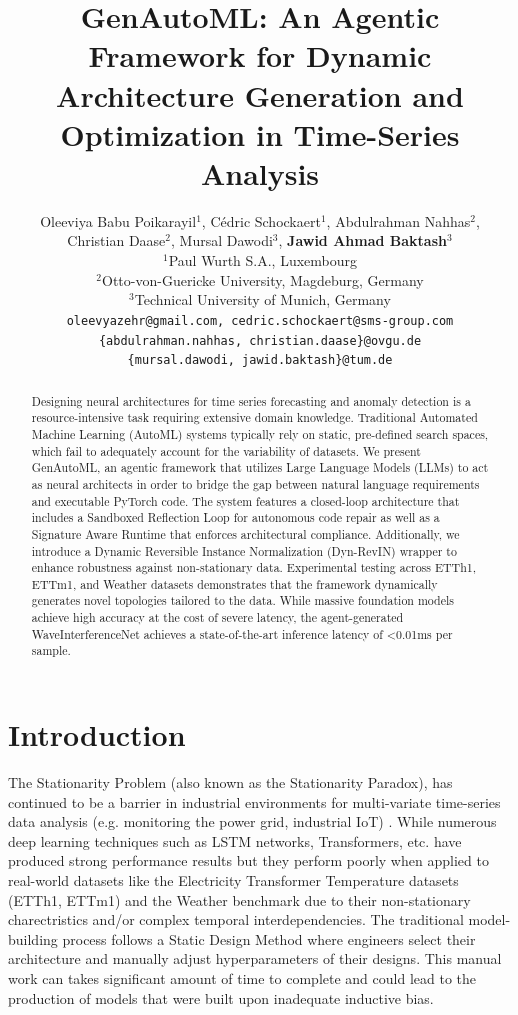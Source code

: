 \documentclass{article}
\title{GenAutoML: An Agentic Framework for Dynamic Architecture Generation and Optimization in Time-Series Analysis}
\author{
Oleeviya Babu Poikarayil$^{1}$, Cédric Schockaert$^{1}$, Abdulrahman Nahhas$^{2}$,\\
Christian Daase$^{2}$, Mursal Dawodi$^{3}$, \textbf{Jawid Ahmad Baktash}$^{3}$\\[0.5ex]
$^{1}$Paul Wurth S.A., Luxembourg\\
$^{2}$Otto-von-Guericke University, Magdeburg, Germany\\
$^{3}$Technical University of Munich, Germany\\[0.5ex]
\texttt{oleevyazehr@gmail.com, cedric.schockaert@sms-group.com}\\
\texttt{\{abdulrahman.nahhas, christian.daase\}@ovgu.de}\\
\texttt{\{mursal.dawodi, jawid.baktash\}@tum.de}
}
\begin{document}
\maketitle


\begin{abstract}
Designing neural architectures for time series forecasting and anomaly detection is a resource-intensive task requiring extensive domain knowledge. Traditional Automated Machine Learning (AutoML) systems typically rely on static, pre-defined search spaces, which fail to adequately account for the variability of datasets. We present GenAutoML, an agentic framework that utilizes Large Language Models (LLMs) to act as neural architects in order to bridge the gap between natural language requirements and executable PyTorch code. The system features a closed-loop architecture that includes a Sandboxed Reflection Loop for autonomous code repair as well as a Signature Aware Runtime that enforces architectural compliance. Additionally, we introduce a Dynamic Reversible Instance Normalization (Dyn-RevIN) wrapper to enhance robustness against non-stationary data. Experimental testing across ETTh1, ETTm1, and Weather datasets demonstrates that the framework dynamically generates novel topologies tailored to the data. While massive foundation models achieve high accuracy at the cost of severe latency, the agent-generated WaveInterferenceNet achieves a state-of-the-art inference latency of <0.01ms per sample.
\end{abstract}

\section{Introduction}

The Stationarity Problem (also known as the Stationarity Paradox), has continued to be a barrier in industrial environments for multi-variate time-series data analysis (e.g. monitoring the power grid, industrial IoT) \cite{liu2022non}. While numerous deep learning techniques such as LSTM networks, Transformers, etc. \cite{lstm, vaswani2017attention} have produced strong performance results but they perform poorly when applied to real-world datasets like the Electricity Transformer Temperature datasets (ETTh1, ETTm1) \cite{zhou2021informer} and the Weather benchmark due to their non-stationary charectristics and/or complex temporal interdependencies. The traditional model-building process follows a Static Design Method where engineers select their architecture and manually adjust hyperparameters of their designs. This manual work can takes significant amount of time to complete and could lead to the production of models that were built upon inadequate inductive bias.
\end{document}
